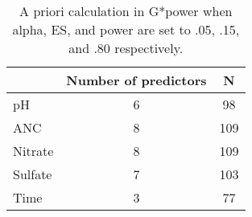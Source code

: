 \begin{table}[htbp]
		\caption{A priori calculation in G*power when alpha, ES, and power are set to .05, .15, and .80 respectively.}
		\begin{center}
		\begin{tabular}{lcc}
		\hline\noalign{\smallskip}
		 & \multicolumn{1}{l}{Number of predictors} & N \\  \hline\noalign{\smallskip}
		pH & 6 & 98 \\ 
		ANC & 8 & 109 \\ 
		Nitrate & 8 & 109 \\ 
		Sulfate & 7 & 103 \\ 
		Time & 3 & 77 \\  \hline
		\end{tabular}
		\end{center}
		\label{tab:APN}
		\end{table}